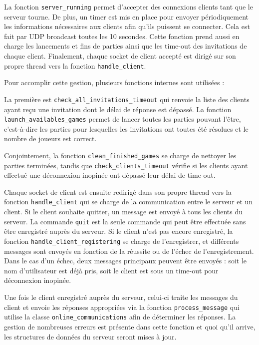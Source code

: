\documentclass[11pt]{article}
\begin{document}
La fonction \texttt{server\_running} permet d'accepter des connexions clients tant que le serveur tourne. De plus, un timer est mis en place pour envoyer périodiquement les informations nécessaires aux clients afin qu'ils puissent se connecter. Cela est fait par UDP broadcast toutes les 10 secondes. Cette fonction prend aussi en charge les lancements et fins de parties ainsi que les time-out des invitations de chaque client. Finalement, chaque socket de client accepté est dirigé sur son propre thread vers la fonction \texttt{handle\_client}.

Pour accomplir cette gestion, plusieurs fonctions internes sont utilisées :

La première est \texttt{check\_all\_invitations\_timeout} qui renvoie la liste des clients ayant reçu une invitation dont le délai de réponse est dépassé. La fonction \texttt{launch\_availables\_games} permet de lancer toutes les parties pouvant l'être, c'est-à-dire les parties pour lesquelles les invitations ont toutes été résolues et le nombre de joueurs est correct. 

Conjointement, la fonction \texttt{clean\_finished\_games} se charge de nettoyer les parties terminées, tandis que \texttt{check\_clients\_timeout} vérifie si les clients ayant effectué une déconnexion inopinée ont dépassé leur délai de time-out.

Chaque socket de client est ensuite redirigé dans son propre thread vers la fonction \texttt{handle\_client} qui se charge de la communication entre le serveur et un client. Si le client souhaite quitter, un message est envoyé à tous les clients du serveur. La commande \texttt{quit} est la seule commande qui peut être effectuée sans être enregistré auprès du serveur. Si le client n'est pas encore enregistré, la fonction \texttt{handle\_client\_registering} se charge de l'enregistrer, et différents messages sont envoyés en fonction de la réussite ou de l'échec de l'enregistrement. Dans le cas d'un échec, deux messages principaux peuvent être envoyés : soit le nom d'utilisateur est déjà pris, soit le client est sous un time-out pour déconnexion inopinée.

Une fois le client enregistré auprès du serveur, celui-ci traite les messages du client et envoie les réponses appropriées via la fonction \texttt{process\_message} qui utilise la classe \texttt{online\_communications} afin de déterminer les réponses. La gestion de nombreuses erreurs est présente dans cette fonction et quoi qu'il arrive, les structures de données du serveur seront mises à jour.
\end{document}
